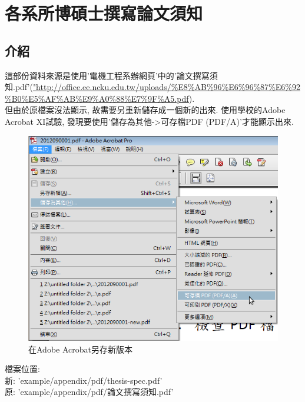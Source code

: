 
\chapter{各系所博碩士撰寫論文須知}
\label{appendix:thesis-spec}

\section{介紹}
這部份資料來源是使用'電機工程系辦網頁'中的'論文撰寫須知.pdf'(\url{"http://office.ee.ncku.edu.tw/uploads/\%E8\%AB\%96\%E6\%96\%87\%E6\%92\%B0\%E5\%AF\%AB\%E9\%A0\%88\%E7\%9F\%A5.pdf}).\\

但由於原檔案沒法顯示, 故需要另重新儲存成一個新的出來. 使用學校的Adobe Acrobat XI試驗, 發現要使用'儲存為其他->可存檔PDF (PDF/A)'才能顯示出來.\\

\begin{figure}[h]
\centering
\includegraphics[scale=0.3]{./example/appendix/pic/save_pdf.png}
\caption{在Adobe Acrobat另存新版本}
\label{fig:appendix:save_pdf}
\end{figure}

檔案位置:\\
新: 'example/appendix/pdf/thesis-spec.pdf'\\
原: 'example/appendix/pdf/論文撰寫須知.pdf'\\



